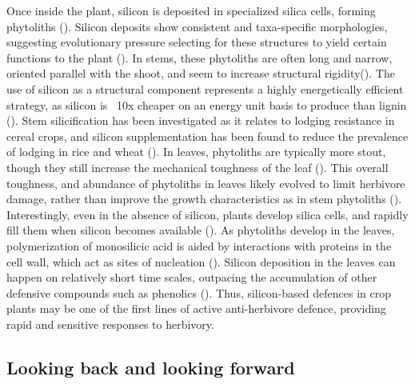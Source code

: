 \documentclass[12pt, letterpaper, ]{article}
\begin{document}
Once inside the plant, silicon is deposited in specialized silica cells, forming phytoliths (\cite{waterman_short-term_2021}). Silicon deposits show consistent and taxa-specific morphologies, suggesting evolutionary pressure selecting for these structures to yield certain functions to the plant (\cite{piperno_phytoliths_2006}). In stems, these phytoliths are often long and narrow, oriented parallel with the shoot, and seem to increase structural rigidity(\cite{stromberg_functions_2016}). The use of silicon as a structural component represents a highly energetically efficient strategy, as silicon is ~10x cheaper on an energy unit basis to produce than lignin (\cite{stromberg_functions_2016}). Stem silicification has been investigated as it relates to lodging resistance in cereal crops, and silicon supplementation has been found to reduce the prevalence of lodging in rice and wheat (\cite{dorairaj_influence_2017,muszynska_mechanistic_2021}). In leaves, phytoliths are typically more stout, though they still increase the mechanical toughness of the leaf (\cite{simpson_still_2017}). This overall toughness, and abundance of phytoliths in leaves likely evolved to limit herbivore damage, rather than improve the growth characteristics as in stem phytoliths (\cite{stromberg_functions_2016}). Interestingly, even in the absence of silicon, plants develop silica cells, and rapidly fill them when silicon becomes available (\cite{waterman_short-term_2021-1}). As phytoliths develop in the leaves, polymerization of monosilicic acid is aided by interactions with proteins in the cell wall, which act as sites of nucleation (\cite{nawaz_phytolith_2019}). Silicon deposition in the leaves can happen on relatively short time scales, outpacing the accumulation of other defensive compounds such as phenolics (\cite{waterman_short-term_2021}). Thus, silicon-based defences in crop plants may be one of the first lines of active anti-herbivore defence, providing rapid and sensitive responses to herbivory. 

\subsection{Looking back and looking forward}
\end{document}
